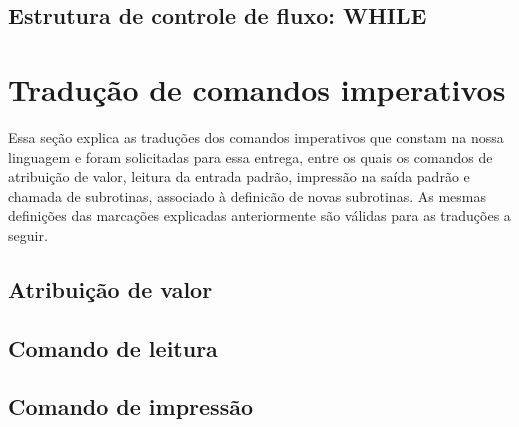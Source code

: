

\subsection{Estrutura de controle de fluxo: WHILE}
\label{sec:while}




\section{Tradução de comandos imperativos}

Essa seção explica as traduções dos comandos imperativos que constam na nossa linguagem e foram solicitadas para essa entrega, entre os quais os comandos de atribuição de valor, leitura da entrada padrão, impressão na saída padrão e chamada de subrotinas, associado à definicão de novas subrotinas. As mesmas definições das marcações explicadas anteriormente são válidas para as traduções a seguir.

\subsection{Atribuição de valor}
\label{sec:atribuicao-valor}



\subsection{Comando de leitura}
\label{sec:leitura}



\subsection{Comando de impressão}
\label{sec:impressao}



